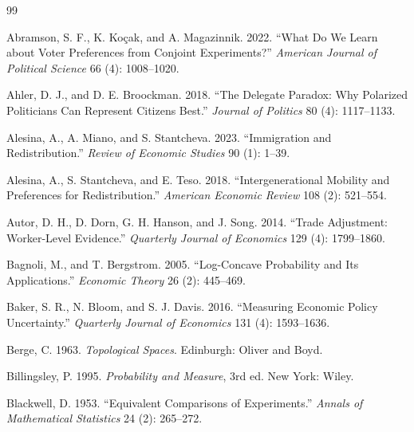 \documentclass[12pt,letterpaper]{article}
\begin{document}
\renewcommand{\refname}{References for the Supplementary Information}
\begin{thebibliography}{99}
\setlength{\itemsep}{2pt}

Abramson, S. F., K. Ko\c{c}ak, and A. Magazinnik. 2022. ``What Do We Learn about Voter Preferences from Conjoint Experiments?'' \textit{American Journal of Political Science} 66 (4): 1008--1020.

Ahler, D. J., and D. E. Broockman. 2018. ``The Delegate Paradox: Why Polarized Politicians Can Represent Citizens Best.'' \textit{Journal of Politics} 80 (4): 1117--1133.

Alesina, A., A. Miano, and S. Stantcheva. 2023. ``Immigration and Redistribution.'' \textit{Review of Economic Studies} 90 (1): 1--39.

Alesina, A., S. Stantcheva, and E. Teso. 2018. ``Intergenerational Mobility and Preferences for Redistribution.'' \textit{American Economic Review} 108 (2): 521--554.

Autor, D. H., D. Dorn, G. H. Hanson, and J. Song. 2014. ``Trade Adjustment: Worker-Level Evidence.'' \textit{Quarterly Journal of Economics} 129 (4): 1799--1860.

Bagnoli, M., and T. Bergstrom. 2005. ``Log-Concave Probability and Its Applications.'' \textit{Economic Theory} 26 (2): 445--469.

Baker, S. R., N. Bloom, and S. J. Davis. 2016. ``Measuring Economic Policy Uncertainty.'' \textit{Quarterly Journal of Economics} 131 (4): 1593--1636.

Berge, C. 1963. \textit{Topological Spaces}. Edinburgh: Oliver and Boyd.

Billingsley, P. 1995. \textit{Probability and Measure}, 3rd ed. New York: Wiley.

Blackwell, D. 1953. ``Equivalent Comparisons of Experiments.'' \textit{Annals of Mathematical Statistics} 24 (2): 265--272.


\end{thebibliography}
\end{document}
